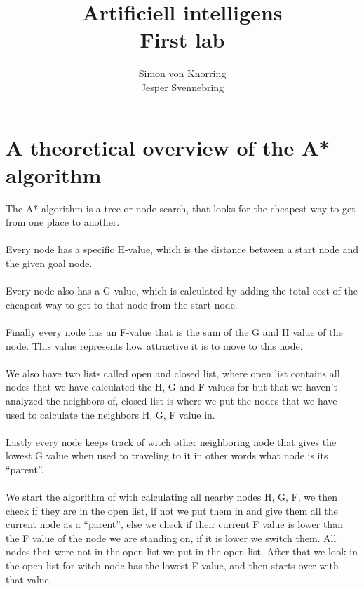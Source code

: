 \documentclass[12pt, a4paper]{article}
\title{Artificiell intelligens\\First lab}
\author{Simon von Knorring\\Jesper Svennebring}
\begin{document}
\maketitle

\newpage
\tableofcontents

\newpage
\section{A theoretical overview of the A* algorithm}
The A* algorithm is a tree or node search, that looks for the cheapest way to get from one place to another.\\\\

Every node has a specific H-value, which is the distance between a start node and the given goal node.\\\\

Every node also has a G-value, which is calculated by adding the total cost of the cheapest way to get to that node from the start node.\\\\

Finally every node has an F-value that is the sum of the G and H value of the node. This value represents how attractive it is to move to this node.\\\\

We also have two lists called open and closed list, where open list contains all nodes that we have calculated the H, G and F values for but that we haven’t analyzed the neighbors of, closed list is where we put the nodes that we have used to calculate the neighbors H, G, F value in.\\\\

Lastly every node keeps track of witch other neighboring node that gives the lowest G value when used to traveling to it in other words what node is its “parent”.\\\\ 

We start the algorithm of with calculating all nearby nodes H, G, F, we then check if they are in the open list, if not we put them in and give them all the current node as a “parent”, else we check if their current F value is lower than the F value of the node we are standing on, if it is lower we switch them. All nodes that were not in the open list we put in the open list. After that we look in the open list for witch node has the lowest F value, and then starts over with that value. 
\end{document}
